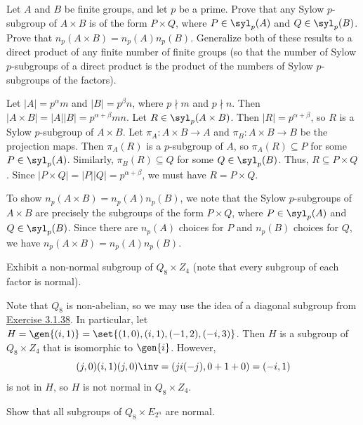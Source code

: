 \begin{exercise}\label{ex5.1.4}
    Let $A$ and $B$ be finite groups, and let $p$ be a prime. Prove that any Sylow $p$-subgroup of $A \times B$ is of the form $P \times Q$, where $P \in \syl_p(A)$ and $Q \in \syl_p(B)$. Prove that $n_p(A \times B) = n_p(A)n_p(B)$. Generalize both of these results to a direct product of any finite number of finite groups (so that the number of Sylow $p$-subgroups of a direct product is the product of the numbers of Sylow $p$-subgroups of the factors).
\end{exercise}

\begin{sol}
    Let $|A| = p^\alpha m$ and $|B| = p^\beta n$, where $p \nmid m$ and $p \nmid n$. Then $|A \times B| = |A||B| = p^{\alpha + \beta}mn$. Let $R \in \syl_p(A \times B)$. Then $|R| = p^{\alpha + \beta}$, so $R$ is a Sylow $p$-subgroup of $A \times B$. Let $\pi_A : A \times B \to A$ and $\pi_B : A \times B \to B$ be the projection maps. Then $\pi_A(R)$ is a $p$-subgroup of $A$, so $\pi_A(R) \subseteq P$ for some $P \in \syl_p(A)$. Similarly, $\pi_B(R) \subseteq Q$ for some $Q \in \syl_p(B)$. Thus, $R \subseteq P \times Q$. Since $|P \times Q| = |P||Q| = p^{\alpha + \beta}$, we must have $R = P \times Q$.

    To show $n_p(A \times B) = n_p(A)n_p(B)$, we note that the Sylow $p$-subgroups of $A \times B$ are precisely the subgroups of the form $P \times Q$, where $P \in \syl_p(A)$ and $Q \in \syl_p(B)$. Since there are $n_p(A)$ choices for $P$ and $n_p(B)$ choices for $Q$, we have $n_p(A \times B) = n_p(A)n_p(B)$.
\end{sol}

\begin{exercise}\label{ex5.1.5}
    Exhibit a non-normal subgroup of $Q_8 \times Z_4$ (note that every subgroup of each factor is normal).
\end{exercise}

\begin{sol}
    Note that $Q_8$ is non-abelian, so we may use the idea of a diagonal subgroup from \hyperref[ex3.1.38]{Exercise 3.1.38}. In particular, let $H = \gen{(i, 1)} = \set{(1, 0), (i, 1), (-1, 2), (-i, 3)}$. Then $H$ is a subgroup of $Q_8 \times Z_4$ that is isomorphic to $\gen{i}$. However,
    \[(j, 0)(i, 1)(j, 0)\inv = (ji(-j), 0 + 1 + 0) = (-i, 1)\]
    is not in $H$, so $H$ is not normal in $Q_8 \times Z_4$.
\end{sol}

\begin{exercise}\label{ex5.1.6}
    Show that all subgroups of $Q_8 \times E_{2^n}$ are normal.
\end{exercise}

